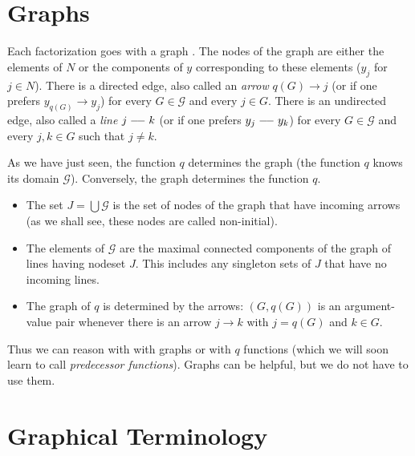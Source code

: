 \section{Graphs}

Each factorization goes with a graph \citep[Section~3.2.3]{lauritzen}.
The nodes of the graph are either the elements of $N$ or the components
of $y$ corresponding to these elements ($y_j$ for $j \in N$).
There is a directed edge, also called an \emph{arrow}
$q(G) \longrightarrow j$ (or if one prefers $y_{q(G)} \longrightarrow y_j$)
for every $G \in \mathcal{G}$ and every $j \in G$.
There is an undirected edge, also called a \emph{line}
$j \myline k$ (or if one prefers $y_j \myline y_k$)
for every $G \in \mathcal{G}$ and every $j, k \in G$ such that $j \neq k$.

As we have just seen, the function $q$ determines the graph
(the function $q$ knows its domain $\mathcal{G}$).
Conversely, the graph determines the function $q$.
\begin{itemize}
\item The set $J = \bigcup \mathcal{G}$ is the set of nodes of the graph
    that have incoming arrows (as we shall see, these nodes are called
    non-initial).
\item The elements of $\mathcal{G}$ are the maximal connected components
    of the graph of lines having nodeset $J$.
    This includes any singleton sets of $J$ that have no incoming lines.
\item The graph of $q$ is determined by the arrows: $(G, q(G))$ is an
    argument-value pair whenever there is an arrow $j \longrightarrow k$
    with $j = q(G)$ and $k \in G$.
\end{itemize}

Thus we can reason with with graphs or with $q$ functions (which we will
soon learn to call \emph{predecessor functions}).
Graphs can be helpful, but we do not have to use them.

\section{Graphical Terminology}
\label{sec:graphical-terminology}


